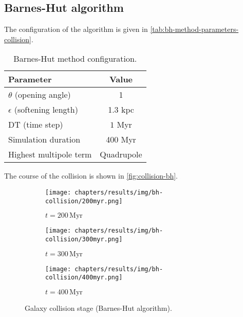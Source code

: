 \subsection{Barnes-Hut algorithm}
The configuration of the algorithm is given in \autoref{tab:bh-method-parameters-collision}.
\begin{table}[htp]
    \centering
    \begin{tabular}{|l|c|}
        \hline
        \textbf{Parameter}            & \textbf{Value} \\
        \hline
        $\theta$ (opening angle)      & 1              \\
        $\epsilon$ (softening length) & 1.3 kpc        \\
        DT (time step)                & $1$ Myr        \\
        Simulation duration           & 400 Myr        \\
        Highest multipole term        & Quadrupole     \\
        \hline
    \end{tabular}
    \caption{Barnes-Hut method configuration.}
    \label{tab:bh-method-parameters-collision}
\end{table}
The course of the collision is shown in \autoref{fig:collision-bh}.
\begin{figure}[htp]
    \centering
    \begin{subfigure}[b]{0.8\textwidth}
        \centering
        \texttt{[image: chapters/results/img/bh-collision/200myr.png]}
        \caption{$t=200\,\text{Myr}$}
        \label{fig:collision-bh-sub1}
    \end{subfigure}

    \vspace{0.2cm}

    \begin{subfigure}[b]{0.8\textwidth}
        \centering
        \texttt{[image: chapters/results/img/bh-collision/300myr.png]}
        \caption{$t=300\,\text{Myr}$}
        \label{fig:collision-bh-sub2}
    \end{subfigure}

    \vspace{0.2cm}

    \begin{subfigure}[b]{0.8\textwidth}
        \centering
        \texttt{[image: chapters/results/img/bh-collision/400myr.png]}
        \caption{$t=400\,\text{Myr}$}
        \label{fig:collision-bh-sub3}
    \end{subfigure}

    \caption{Galaxy collision stage (Barnes-Hut algorithm).}
    \label{fig:collision-bh}
\end{figure}
